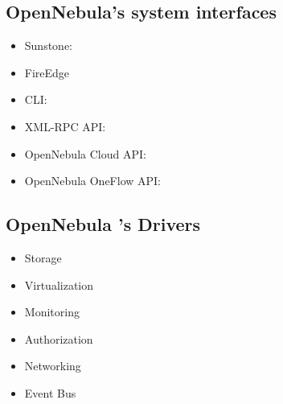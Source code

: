 \subsection{OpenNebula’s system interfaces}
\begin{itemize}
    \item Sunstone:
    \item FireEdge
    \item CLI:
    \item XML-RPC API:
    \item OpenNebula Cloud API:
    \item OpenNebula OneFlow API:
\end{itemize}
\subsection{OpenNebula 's Drivers}
\begin{itemize}
    \item Storage
    \item Virtualization
    \item Monitoring
    \item Authorization
    \item Networking
    \item Event Bus
\end{itemize}